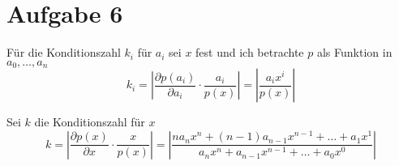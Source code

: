 \documentclass[10pt,a4paper]{article}
\begin{document}
\section{Aufgabe 6}

Für die Konditionszahl $k_{i}$ für $a_{i}$ sei $x$ fest und ich betrachte $p$ als Funktion in $a_{0}, \dots, a_{n}$
\begin{equation}
  k_{i} = |\frac{\partial p(a_{i})}{\partial a_{i}} \cdot \frac{a_{i}}{p(x)}| = |\frac{a_{i} x^{i}}{p(x)}|
\end{equation}

Sei $k$ die Konditionszahl für $x$
\begin{equation}
  k = |\frac{\partial p(x)}{\partial x} \cdot \frac{x}{p(x)}| = |\frac{na_{n}x^{n} + (n - 1)a_{n - 1}x^{n - 1} + \dots + a_{1}x^{1}}{a_{n}x^{n} + a_{n - 1}x^{n - 1} + \dots + a_{0}x^{0}}|
\end{equation}
\end{document}
